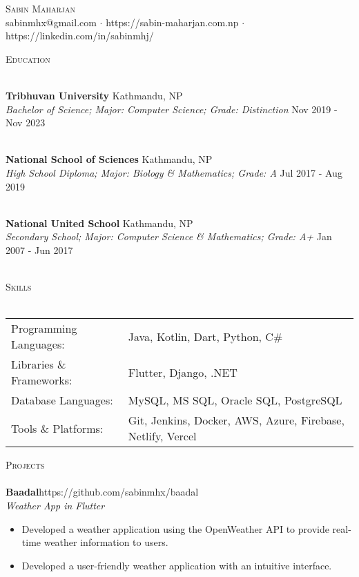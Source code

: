 \documentclass[a4paper]{article}
\newcommand{\lineunder} {
    \vspace*{-8pt} \\
    \hspace*{-18pt} \hrulefill \\
}
\newcommand{\header} [1] {
    {\hspace*{-18pt}\vspace*{6pt} \textsc{#1}}
    \vspace*{-6pt} \lineunder
}
\begin{document}
\vspace*{-40pt}

    

\vspace*{-10pt}
\begin{center}
	{\Huge \scshape {Sabin Maharjan}}\\
	sabinmhx@gmail.com $\cdot$ https://sabin-maharjan.com.np $\cdot$ https://linkedin.com/in/sabinmhj/\\
\end{center}



\header{Education}
\vspace{1mm}

\textbf{Tribhuvan University} \hfill Kathmandu, NP\\
\textit{Bachelor of Science; Major: Computer Science; Grade: Distinction} \hfill Nov 2019 - Nov 2023\\
\vspace{-1mm}
\

\textbf{National School of Sciences} \hfill Kathmandu, NP\\
\textit{High School Diploma; Major: Biology \& Mathematics; Grade: A} \hfill Jul 2017 - Aug 2019\\
\vspace{-1mm}
\

\textbf{National United School} \hfill Kathmandu, NP\\
\textit{Secondary School; Major: Computer Science \& Mathematics; Grade: A+} \hfill Jan 2007 - Jun 2017\\
\vspace{-1mm}
\


\header{Skills}
\begin{tabularx}{\textwidth}{ l X } 
	Programming Languages: & Java, Kotlin, Dart, Python, C\#      \\
	Libraries \& Frameworks:  & Flutter, Django, .NET  \\
    Database Languages:  & MySQL, MS SQL, Oracle SQL, PostgreSQL  \\
    Tools \& Platforms:  & Git, Jenkins, Docker, AWS, Azure, Firebase, Netlify, Vercel \\
\end{tabularx}
\vspace{2mm}

\header{Projects}
{\textbf{Baadal}}\hfill https://github.com/sabinmhx/baadal\\
\textit{Weather App in Flutter}
\begin{itemize} \itemsep 1pt
	\item Developed a weather application using the OpenWeather API to provide real-time weather information to users.   
	\item Developed a user-friendly weather application with an intuitive interface.
\end{itemize}
\end{document}
